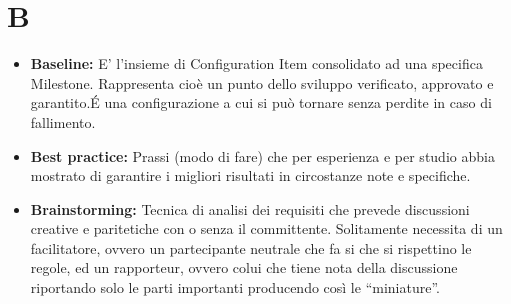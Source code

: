 \documentclass[a4paper]{article}
\begin{document}
	\section*{B}
		\begin{itemize}
			\item \textbf{Baseline:} E' l'insieme di Configuration Item consolidato ad una specifica Milestone. Rappresenta 
			cioè un punto dello sviluppo verificato, approvato e garantito.\'E una configurazione a cui si può tornare senza perdite
			 in caso di fallimento.
			\item \textbf{Best practice:} Prassi (modo di fare) che per esperienza e per studio abbia mostrato di 
			garantire i migliori risultati in circostanze note e specifiche. 
			\item \textbf{Brainstorming:} Tecnica di analisi dei requisiti che prevede discussioni creative e paritetiche 
			con o senza il committente. Solitamente necessita di un facilitatore, ovvero un partecipante neutrale che fa 
			si che si rispettino le regole, ed un rapporteur, ovvero colui che tiene nota della discussione riportando solo 
			le parti importanti producendo così le “miniature”.
		\end{itemize}
		
\end{document}
